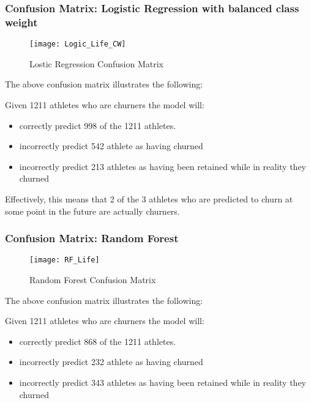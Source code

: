 \documentclass[
10pt, %
a4paper, %
oneside, %
headinclude,footinclude, %
BCOR5mm, %
]{scrartcl}
\begin{document}
\subsubsection{Confusion Matrix: Logistic Regression with balanced class weight}

\begin{figure}[H]
\centering 
\texttt{[image: Logic\_Life\_CW]} 
\caption[Lostic Regression Confusion Matrix]{Lostic Regression Confusion Matrix} %
\label{fig:gallery} 
\end{figure}

The above confusion matrix illustrates the following: 

Given 1211 athletes who are churners the model will:

\begin{itemize}
\item correctly predict 998 of the 1211 athletes. 
\item incorrectly predict 542 athlete as having churned 
\item incorrectly predict 213 athletes as having been retained while in reality they churned
\end{itemize}

Effectively, this means that 2 of the 3 athletes who are predicted to churn at some point in the future are actually churners.

\subsubsection{Confusion Matrix: Random Forest}

\begin{figure}[H]
\centering 
\texttt{[image: RF\_Life]} 
\caption[Lostic Regression Confusion Matrix]{Random Forest Confusion Matrix} %
\label{fig:gallery} 
\end{figure}

The above confusion matrix illustrates the following: 

Given 1211 athletes who are churners the model will:

\begin{itemize}
\item correctly predict 868 of the 1211 athletes. 
\item incorrectly predict 232 athlete as having churned 
\item incorrectly predict 343 athletes as having been retained while in reality they churned
\end{itemize}
\end{document}
